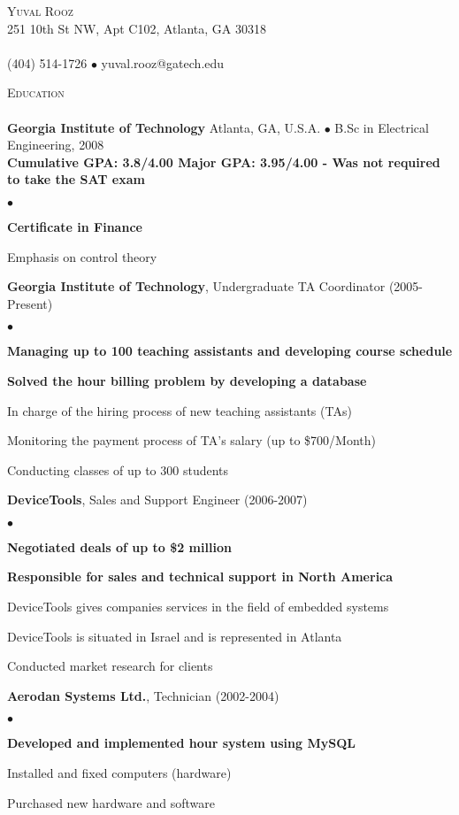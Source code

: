 \documentclass[12pt]{article}
\newcommand{\lineunder}{\vspace*{-9pt} \\ \hspace*{-18pt} \hrulefill \\}
\newcommand{\header}[1]{{\hspace*{-15pt}\vspace*{6pt} \textsc{#1}} \vspace*{-9pt} \lineunder}
\newcommand{\employer}[2]{{ #1 (#2) }}
\newcommand{\contact}[3]{
\vspace*{-11pt}
\begin{center}
{\LARGE \scshape {#1}}\\
#2 \lineunder
#3
\end{center}
\vspace*{-4pt}
}
\newenvironment{achievements}{\begin{list}{$\bullet$}{\topsep 0pt \itemsep -2pt}}{\vspace*{4pt}\end{list}}
\newcommand{\schoolwithcourses}[4]{
 \textbf{#1} #2 $\bullet$ #3\\
#4 \\
\vspace*{5pt}
}
\begin{document}
\small
\smallskip
\vspace*{-44pt}

\contact{\LARGE{Yuval Rooz}}
{251 10th St NW, Apt C102, Atlanta, GA 30318}
{(404) 514-1726 $\bullet$ yuval.rooz@gatech.edu}

\header{Education}

\schoolwithcourses{Georgia Institute of Technology}{Atlanta, GA, U.S.A.}{B.Sc in Electrical Engineering, 2008}
{\textbf{Cumulative GPA: 3.8/4.00  Major GPA: 3.95/4.00 - Was not required to take the SAT exam}}
    \begin{achievements}
	   \item \textbf{Certificate in Finance}
	   \item Emphasis on control theory
    \end{achievements}

\employer{\textbf{Georgia Institute of Technology}, Undergraduate TA Coordinator}{2005-Present}
	\begin{achievements}
	\item \textbf{Managing up to 100 teaching assistants and developing course schedule}
	\item \textbf{Solved the hour billing problem by developing a database}
	\item In charge of the hiring process of new teaching assistants (TAs)
	\item Monitoring the payment process of TA's salary (up to \$700/Month)
	\item Conducting classes of up to 300 students
	\end{achievements}

\employer{\textbf{DeviceTools},     Sales and Support Engineer}{2006-2007}
	\begin{achievements}
	\item \textbf{Negotiated deals of up to \$2 million}
	\item \textbf{Responsible for sales and technical support in North America}
	\item DeviceTools gives companies services in the field of embedded systems
	\item DeviceTools is situated in Israel and is represented in Atlanta
	\item Conducted market research for clients
	\end{achievements}

\employer{\textbf{Aerodan Systems Ltd.}, Technician}{2002-2004}
	\begin{achievements}
	\item \textbf{Developed and implemented hour system using MySQL}
	\item Installed and fixed computers (hardware)
	\item Purchased new hardware and software
	\end{achievements}
\end{document}
